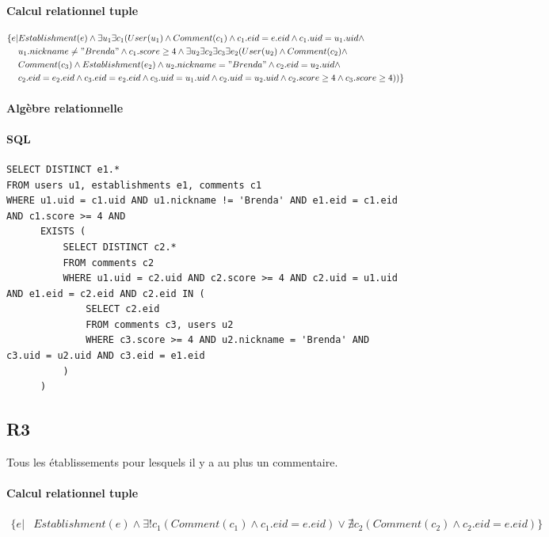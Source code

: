 \documentclass[11pt,a4paper]{report}
\begin{document}
\paragraph*{Calcul relationnel tuple}
\begin{align*}
\{e|& Establishment(e) \wedge \exists u_{1} \exists c_{1} (User(u_{1}) \wedge Comment(c_{1}) \wedge c_{1}.eid = e.eid \wedge c_{1}.uid=u_{1}.uid \wedge \\
& u_{1}.nickname \neq "Brenda" \wedge c_{1}.score \geq 4 \wedge  \exists u_{2} \exists c_{2} \exists c_{3} \exists e_{2} ( User(u_{2}) \wedge Comment(c_{2})\wedge \\
& Comment(c_{3}) \wedge Establishment(e_{2}) \wedge u_{2}.nickname = "Brenda" \wedge c_{2}.eid = u_{2}.uid \wedge \\
& c_{2}.eid = e_{2}.eid \wedge  c_{3}.eid = e_{2}.eid \wedge  c_{3}.uid = u_{1}.uid \wedge  c_{2}.uid = u_{2}.uid \wedge c_{2}.score \geq 4 \wedge c_{3}.score \geq 4
))
\}
\end{align*}
\paragraph*{Algèbre relationnelle}
\paragraph*{SQL}
\begin{verbatim}
SELECT DISTINCT e1.*
FROM users u1, establishments e1, comments c1
WHERE u1.uid = c1.uid AND u1.nickname != 'Brenda' AND e1.eid = c1.eid AND c1.score >= 4 AND 
      EXISTS (
          SELECT DISTINCT c2.*
          FROM comments c2 
          WHERE u1.uid = c2.uid AND c2.score >= 4 AND c2.uid = u1.uid AND e1.eid = c2.eid AND c2.eid IN (
              SELECT c2.eid
              FROM comments c3, users u2
              WHERE c3.score >= 4 AND u2.nickname = 'Brenda' AND c3.uid = u2.uid AND c3.eid = e1.eid
          )
      )
\end{verbatim}
\subsection*{R3}
Tous les établissements pour lesquels il y a au plus un commentaire.
\paragraph*{Calcul relationnel tuple}
\begin{align*}
\{ e | & Establishment(e) \wedge \exists! c_{1} ( Comment(c_{1}) \wedge c_{1}.eid = e.eid ) \vee \nexists c_{2} ( Comment(c_{2}) \wedge c_{2}.eid = e.eid )
\}
\end{align*}
\end{document}
